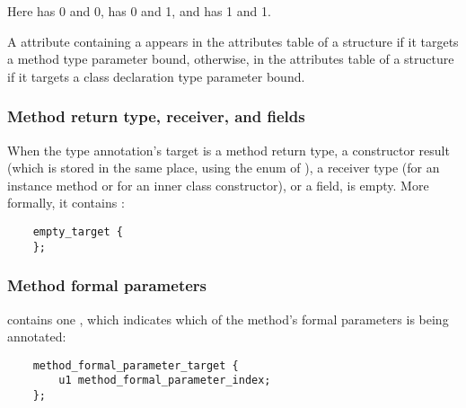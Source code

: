\documentclass[10pt]{article}
\begin{document}
\noindent
Here
 has  0 and  0,
 has  0 and  1, and
 has  1 and  1.

A \RuntimeInOrVisibleTypeAnnotations attribute containing a
 appears in the attributes table of a
 structure if it targets a method type parameter bound,
otherwise, in the attributes table of a  structure if it
targets a class declaration type parameter bound.


\subsubsection{Method return type, receiver, and fields\label{class-file:ext:ri:return}\label{class-file:ext:ri:receiver}}

When the type annotation's target is a method return type, a constructor
result (which is stored in the same place, using the 
enum of ), a receiver type (for an instance method or for an inner class
constructor), or a field,  is empty.
More formally, it contains :

\preverbnegspace
\begin{Verbatim}
    empty_target {
    };
\end{Verbatim}



\subsubsection{Method formal parameters\label{class-file:ext:ri:formal-parameters}}

 contains one , which
indicates which of the method's formal parameters is being annotated:

\preverbnegspace
\begin{Verbatim}
    method_formal_parameter_target {
        u1 method_formal_parameter_index;
    };
\end{Verbatim}
\end{document}

